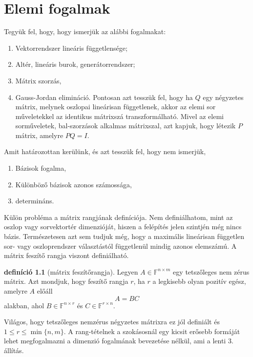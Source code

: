 \documentclass[9pt,showtrims]{memoir}
\theoremstyle{plain}
\theoremstyle{remark}
\theoremstyle{definition}
\newtheorem{definition}[proposition]{definíció}
\renewcommand{\mathbf}{\mathbb}
\begin{document}
\chapter{Elemi fogalmak}
Tegyük fel, hogy, hogy ismerjük az alábbi fogalmakat:
\begin{enumerate}
    \item Vektorrendszer lineáris függetlensége;
    \item Altér, lineáris burok, generátorrendszer;
    \item Mátrix szorzás,
    \item Gauss-Jordan elimináció. Pontosan azt tesszük fel, hogy ha $Q$ egy négyzetes mátrix, melynek oszlopai
        lineárisan függetlenek, akkor az elemi sor műveletekkel az identikus mátrixszá transzformálható.
        Mivel az elemi sorműveletek, bal-szorzások alkalmas mátrixszal, 
        azt kapjuk, hogy létezik $P$ mátrix, amelyre $PQ=I$.
\end{enumerate}
Amit határozottan kerülünk, és azt tesszük fel, hogy nem ismerjük,
\begin{enumerate}
    \item Bázisok fogalma,
    \item Különböző bázisok azonos számossága,
    \item determináns.
\end{enumerate}
Külön probléma a mátrix rangjának definíciója.
Nem definiálhatom, 
mint az oszlop vagy sorvektortér dimenzióját, hiszen a felépítés jelen szintjén még nincs bázis.
Természetesen azt sem tudjuk még, hogy a maximális lineárisan független sor- vagy oszloprendszer választástól függetlenül mindig azonos elemszámú.
A mátrix feszítő rangja viszont definiálható.
\begin{definition}[mátrix feszítőrangja]
    Legyen $A\in\mathbf{F}^{n\times m}$ egy tetszőleges nem zérus mátrix.
    Azt mondjuk, hogy feszítő rangja $r$, ha $r$ a legkisebb olyan pozitív egész, amelyre $A$ előáll
    \[
        A=BC
    \]
    alakban, ahol $B\in\mathbf{F}^{n\times r}$ és $C\in\mathbb{F}^{r\times n}$.
\end{definition}
Világos, hogy tetszőleges nemzérus négyzetes mátrixra ez jól definiált és $1\leq r \leq \min\{n,m\}$.
A rang-tételnek a szokásosnál egy kicsit erősebb formáját lehet megfogalmazni a dimenzió fogalmának bevezetése nélkül,
ami a lenti 3. állítás.
\end{document}
